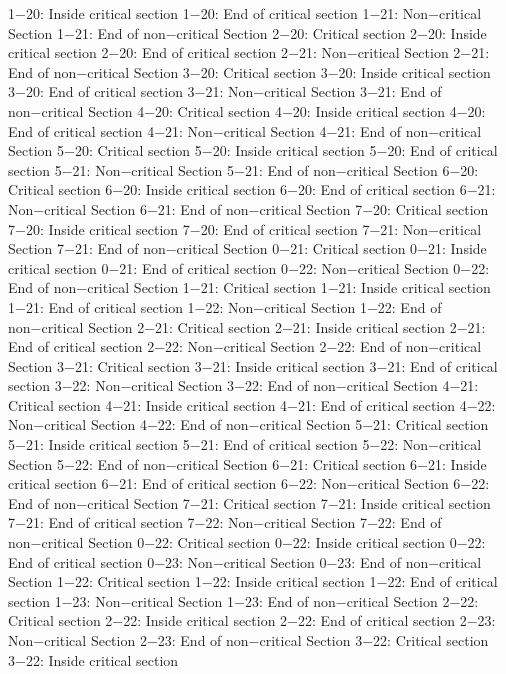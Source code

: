 1−20: Inside critical section
1−20: End of critical section
1−21: Non−critical Section
1−21: End of non−critical Section
2−20: Critical section
2−20: Inside critical section
2−20: End of critical section
2−21: Non−critical Section
2−21: End of non−critical Section
3−20: Critical section
3−20: Inside critical section
3−20: End of critical section
3−21: Non−critical Section
3−21: End of non−critical Section
4−20: Critical section
4−20: Inside critical section
4−20: End of critical section
4−21: Non−critical Section
4−21: End of non−critical Section
5−20: Critical section
5−20: Inside critical section
5−20: End of critical section
5−21: Non−critical Section
5−21: End of non−critical Section
6−20: Critical section
6−20: Inside critical section
6−20: End of critical section
6−21: Non−critical Section
6−21: End of non−critical Section
7−20: Critical section
7−20: Inside critical section
7−20: End of critical section
7−21: Non−critical Section
7−21: End of non−critical Section
0−21: Critical section
0−21: Inside critical section
0−21: End of critical section
0−22: Non−critical Section
0−22: End of non−critical Section
1−21: Critical section
1−21: Inside critical section
1−21: End of critical section
1−22: Non−critical Section
1−22: End of non−critical Section
2−21: Critical section
2−21: Inside critical section
2−21: End of critical section
2−22: Non−critical Section
2−22: End of non−critical Section
3−21: Critical section
3−21: Inside critical section
3−21: End of critical section
3−22: Non−critical Section
3−22: End of non−critical Section
4−21: Critical section
4−21: Inside critical section
4−21: End of critical section
4−22: Non−critical Section
4−22: End of non−critical Section
5−21: Critical section
5−21: Inside critical section
5−21: End of critical section
5−22: Non−critical Section
5−22: End of non−critical Section
6−21: Critical section
6−21: Inside critical section
6−21: End of critical section
6−22: Non−critical Section
6−22: End of non−critical Section
7−21: Critical section
7−21: Inside critical section
7−21: End of critical section
7−22: Non−critical Section
7−22: End of non−critical Section
0−22: Critical section
0−22: Inside critical section
0−22: End of critical section
0−23: Non−critical Section
0−23: End of non−critical Section
1−22: Critical section
1−22: Inside critical section
1−22: End of critical section
1−23: Non−critical Section
1−23: End of non−critical Section
2−22: Critical section
2−22: Inside critical section
2−22: End of critical section
2−23: Non−critical Section
2−23: End of non−critical Section
3−22: Critical section
3−22: Inside critical section
